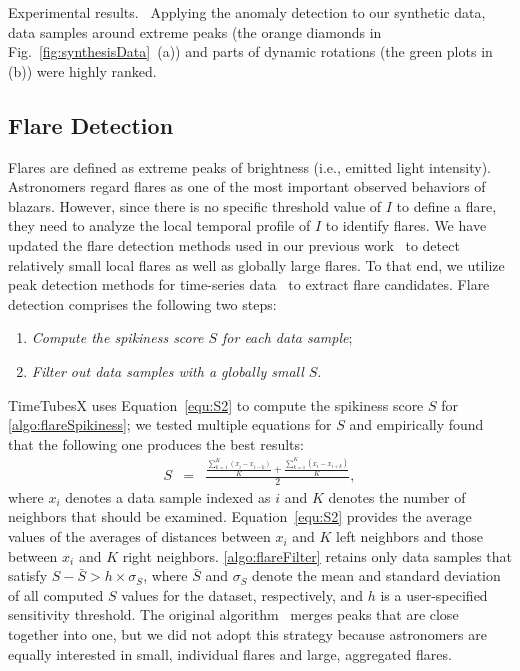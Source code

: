 \textsf{Experimental results.\ } Applying the anomaly detection to our synthetic data, 
data samples around extreme peaks (the orange diamonds in Fig.~\ref{fig:synthesisData}~(a)) and parts of dynamic rotations (the green plots in (b)) were highly ranked.


\subsection{Flare Detection}\label{sec:flareDetection}
Flares are defined as extreme peaks of brightness (i.e., emitted light intensity). 
Astronomers regard flares as one of the most important observed behaviors of blazars.
However, since there is no specific threshold value of $I$ to define a flare, 
they need to analyze the local temporal profile of $I$ to identify flares.
We have updated the flare detection methods used in our previous work~\cite{Sawada2018}
to detect relatively small local flares as well as globally large flares.
To that end, we utilize peak detection methods for time-series data~\cite{Palshikar2009} to extract flare candidates. 
Flare detection comprises the following two steps:
\begin{enumerate}[nosep, label=\textsl{Step \arabic*}:, ref=\textsl{Step \arabic*}, align=parleft, leftmargin=*]
    \item \textsl{Compute the spikiness score $S$ for each data sample}; \label{algo:flareSpikiness}
    \item \textsl{Filter out data samples with a globally small $S$}. \label{algo:flareFilter}
\end{enumerate}
TimeTubesX uses Equation~\ref{equ:S2} to compute the spikiness score $S$ for \ref{algo:flareSpikiness};
we tested multiple equations for $S$ and empirically found that the following one produces the best results:
\begin{eqnarray}
    S &=& \frac{\frac{\sum_{k=1}^{K}(x_i - x_{i - k})}{K} + \frac{\sum_{k=1}^{K}(x_i - x_{i + k})}{K}}{2}\label{equ:S2},
\end{eqnarray}
where $x_i$ denotes a data sample indexed as $i$ and $K$ denotes the number of neighbors that should be examined.
Equation~\ref{equ:S2} provides the average values of the averages of distances between $x_i$ and $K$ left neighbors and those between $x_i$ and $K$ right neighbors.
\ref{algo:flareFilter} retains only data samples that satisfy $S - \bar{S} > h \times \sigma_{S}$, 
where $\bar{S}$ and $\sigma_{S}$ denote the mean and standard deviation of all computed $S$ values for the dataset, respectively, 
and $h$ is a user-specified sensitivity threshold. 
The original algorithm~\cite{Palshikar2009} merges peaks that are close together into one, 
but we did not adopt this strategy
because astronomers are equally interested in small, individual flares and large, aggregated flares.

